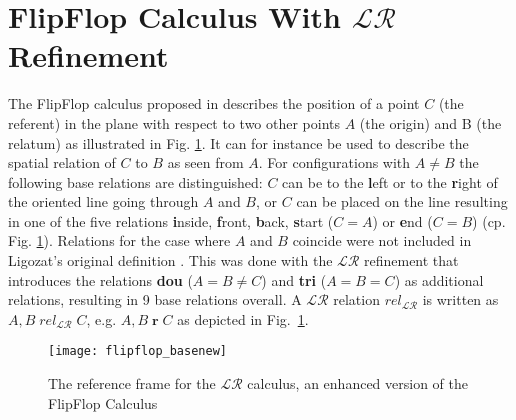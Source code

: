 \section{FlipFlop Calculus With  $\mathcal{LR}$ Refinement} \label{sec:flip-flop}
%
%
%


The FlipFlop calculus proposed in \citet{Ligozat93_FlipFlopCalculus}
describes the position of a
point $C$ (the referent) in the plane with respect to two other points
$A$ (the origin) and B (the relatum) as illustrated in Fig.
\ref{fig:FFC}. It can for instance be used to describe the spatial
relation of $C$ to $B$ as seen from $A$. For configurations with $A\neq B
$ the following base relations are distinguished: $C$ can be to the
\textbf{l}eft or to the \textbf{r}ight of the oriented line going
through $A$ and $B$, or $C$ can be placed on the line resulting in one of
the five relations \textbf{i}nside, \textbf{f}ront, \textbf{b}ack,
\textbf{s}tart ($C = A$) or \textbf{e}nd ($C = B$) (cp. Fig.
\ref{fig:FFC}). Relations for the case where $A$ and $B$ coincide were
not included in Ligozat's original definition
\citep{Ligozat93_FlipFlopCalculus}. This was done with the $\mathcal{LR}$
refinement \citep{scivos:nebel:icsc-04} that introduces the relations
\textbf{dou} ($A=B \neq C$) and \textbf{tri} ($A=B=C$) as additional
relations, resulting in 9 base relations overall. A $\mathcal{LR}$ relation $rel_\mathcal{LR}$
is written as $A,B\; rel_\mathcal{LR}\; C$, e.g. $A,B\; \textbf{r}\; C$ as depicted in Fig.~\ref{fig:FFC}.


\begin{figure}[htp]
	\centering
	\texttt{[image: flipflop\_basenew]}
	\caption{The reference frame for the $\mathcal{LR}$ calculus, an enhanced version
		 of the FlipFlop Calculus}
	\label{fig:FFC}
\end{figure}
